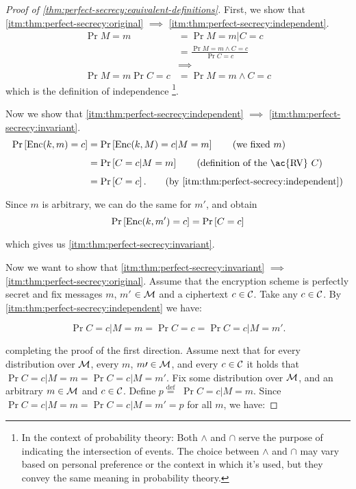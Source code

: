 \begin{proof}[Proof of \cref{thm:perfect-secrecy:equivalent-definitions}]
	First, we show that \ref{itm:thm:perfect-secrecy:original} $\implies$ \ref{itm:thm:perfect-secrecy:independent}.
	\begin{align*}
		\Pr{M=m} & = \Pr{M = m | C = c} \\
		& = \frac{\Pr{M = m \land C = c}}{\Pr{C = c}} \tag{by Bayes}
		\\
		& \implies \\
		\Pr{M = m} \Pr{C = c}
		& =
		\Pr{M = m \land C = c}
	\end{align*}
	which is the definition of independence \footnote{In the context of probability theory: Both \( \land \) and \( \cap \) serve the purpose of indicating the intersection of events. The choice between \( \land \) and \( \cap \) may vary based on personal preference or the context in which it's used, but they convey the same meaning in probability theory.}.

	Now we show that \ref{itm:thm:perfect-secrecy:independent} $\implies$ \ref{itm:thm:perfect-secrecy:invariant}.
	\begin{align*}
		\Pr{\GenericEnc(k, m) = c} 
		& =
		\Pr{\GenericEnc(k, M) = c | M = m} \tag{we fixed $m$}
		\\
		& = \Pr{C = c | M = m} \tag{definition of the \ac{RV} $C$}
		\\
		& = \Pr{C = c}. \tag{by \ref{itm:thm:perfect-secrecy:independent}}
	\end{align*}
	Since $m$ is arbitrary, we can do the same for $m'$, and obtain
	\begin{equation*}
		\mathop{\mathrm{Pr}}\limits_{} \left[ {\mathrm{Enc}(k,m') = c} \right] = \mathop{\mathrm{Pr}}\limits_{} \left[ {C = c} \right]
	\end{equation*}
	which gives us \ref{itm:thm:perfect-secrecy:invariant}.

	Now we want to show that \ref{itm:thm:perfect-secrecy:invariant} $\implies$ \ref{itm:thm:perfect-secrecy:original}. Assume that the encryption scheme is perfectly secret and fix messages $m$, $m\prime$ $\in \mathcal{M}$ and a ciphertext $c \in \mathcal{C}$. Take any $c \in \mathcal{C}$. By \ref{itm:thm:perfect-secrecy:independent} we have:

	\begin{equation*}
		\Pr {C = c | M = m} = \Pr {C = c} = \Pr {C = c | M = m'}.
	\end{equation*}

	completing the proof of the first direction.
	Assume next that for every distribution over $\mathcal{M}$, every $m$, $m\prime \in \mathcal{M}$, and every $c \in \mathcal{C}$ it holds that $\Pr {C = c | M = m} = \Pr {C = c | M = m\prime}$. Fix some distribution over $\mathcal{M}$, and an arbitrary $m \in \mathcal{M}$ and $c \in \mathcal{C}$. Define $p \stackrel{\text{def}}{=}$ $\Pr {C = c | M = m}$. Since $\Pr {C = c | M = m} = \Pr {C = c | M = m'} = p$ for all $m$, we have:


\end{proof}
